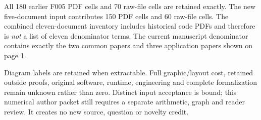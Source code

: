 \documentclass[a4paper,11pt]{article}
\begin{document}
All 180 earlier F005 PDF cells and 70 raw-file cells are retained exactly.
The new five-document input contributes 150 PDF cells and 60 raw-file cells.
The combined eleven-document inventory includes historical code PDFs and
therefore is \emph{not} a list of eleven denominator terms. The current
manuscript denominator contains exactly the two common papers and three
application papers shown on page 1.

Diagram labels are retained when extractable. Full graphic/layout cost,
retained outside proofs, original software, runtime, engineering and complete
formalization remain unknown rather than zero. Distinct input acceptance is
bound; this numerical author packet still requires a separate arithmetic,
graph and reader review. It creates no new source, question or novelty credit.
\end{document}
